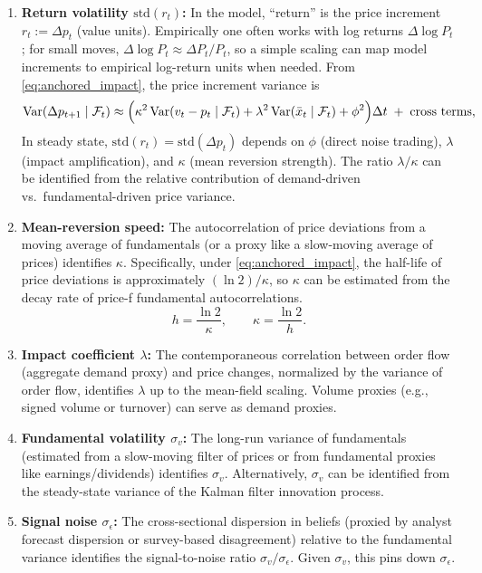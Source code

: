 \begin{enumerate}[label=(\arabic*)]
\item \textbf{Return volatility $\mathrm{std}(r_t)$:} In the model, ``return'' is the price increment $r_t := \Delta p_t$ (value units). Empirically one often works with log returns $\Delta\log P_t$; for small moves, $\Delta\log P_t \approx \Delta P_t/P_t$, so a simple scaling can map model increments to empirical log-return units when needed. From \eqref{eq:anchored_impact}, the price increment variance is
\[
\text{Var}(\Delta p_{t+1}\mid \mathcal F_t) \approx
\Big(\kappa^2\,\text{Var}(v_t-p_t\mid \mathcal F_t)+\lambda^2\,\text{Var}(\bar x_t\mid \mathcal F_t)+\phi^2\Big)\Delta t
\;+\;\text{cross terms},
\]
In steady state, $\mathrm{std}(r_t) = \mathrm{std}(\Delta p_t)$ depends on $\phi$ (direct noise trading), $\lambda$ (impact amplification), and $\kappa$ (mean reversion strength). The ratio $\lambda/\kappa$ can be identified from the relative contribution of demand-driven vs.\ fundamental-driven price variance.

\item \textbf{Mean-reversion speed:} The autocorrelation of price deviations from a moving average of fundamentals (or a proxy like a slow-moving average of prices) identifies $\kappa$. Specifically, under \eqref{eq:anchored_impact}, the half-life of price deviations is approximately $(\ln 2)/\kappa$, so $\kappa$ can be estimated from the decay rate of price-f fundamental autocorrelations.
\begin{equation}
h = \frac{\ln 2}{\kappa},\qquad \kappa = \frac{\ln 2}{h}.
\label{eq:half_life_conversion}
\end{equation}

\item \textbf{Impact coefficient $\lambda$:} The contemporaneous correlation between order flow (aggregate demand proxy) and price changes, normalized by the variance of order flow, identifies $\lambda$ up to the mean-field scaling. Volume proxies (e.g., signed volume or turnover) can serve as demand proxies.

\item \textbf{Fundamental volatility $\sigma_v$:} The long-run variance of fundamentals (estimated from a slow-moving filter of prices or from fundamental proxies like earnings/dividends) identifies $\sigma_v$. Alternatively, $\sigma_v$ can be identified from the steady-state variance of the Kalman filter innovation process.

\item \textbf{Signal noise $\sigma_\epsilon$:} The cross-sectional dispersion in beliefs (proxied by analyst forecast dispersion or survey-based disagreement) relative to the fundamental variance identifies the signal-to-noise ratio $\sigma_v/\sigma_\epsilon$. Given $\sigma_v$, this pins down $\sigma_\epsilon$.
\end{enumerate}

